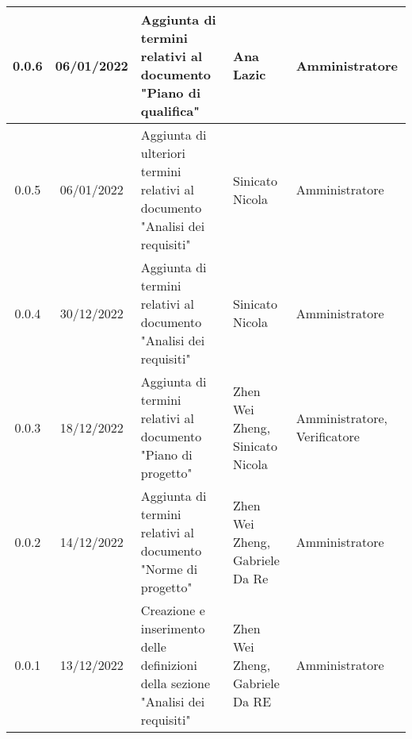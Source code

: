 \begin{center}
\begin{tabularx}{\textwidth}{| c | c | X | X | X |}
 \hline
 0.0.6 & 06/01/2022 & Aggiunta di termini relativi al documento "Piano di qualifica" & Ana Lazic & Amministratore \\
 \hline
 0.0.5 & 06/01/2022 & Aggiunta di ulteriori termini relativi al documento "Analisi dei requisiti" & Sinicato Nicola & Amministratore \\
 \hline
 0.0.4 & 30/12/2022 & Aggiunta di termini relativi al documento "Analisi dei requisiti" & Sinicato Nicola & Amministratore \\
 \hline
 0.0.3 & 18/12/2022 & Aggiunta di termini relativi al documento "Piano di progetto" & Zhen Wei Zheng, Sinicato Nicola & Amministratore, Verificatore\\
 \hline
 0.0.2 & 14/12/2022 & Aggiunta di termini relativi al documento "Norme di progetto" & Zhen Wei Zheng, Gabriele Da Re & Amministratore\\
 \hline
 0.0.1 & 13/12/2022 & Creazione e inserimento delle definizioni della sezione "Analisi dei requisiti" & Zhen Wei Zheng, Gabriele Da RE & Amministratore\\
 \hline
\end{tabularx}
\end{center}
